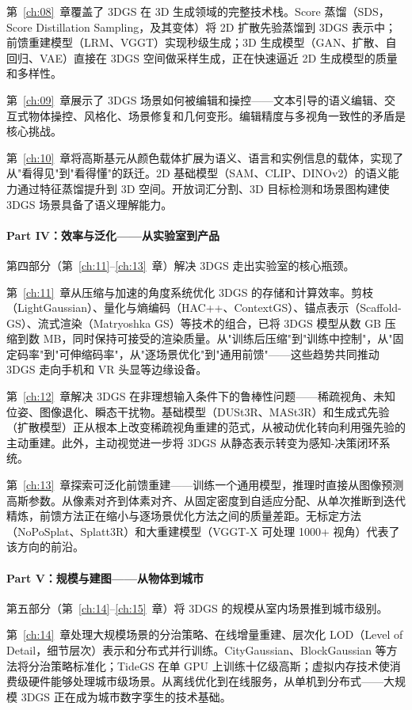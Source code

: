 第~\ref{ch:08}~章覆盖了 3DGS 在 3D 生成领域的完整技术栈。Score 蒸馏（SDS，Score Distillation Sampling，及其变体）将 2D 扩散先验蒸馏到 3DGS 表示中；前馈重建模型（LRM、VGGT）实现秒级生成；3D 生成模型（GAN、扩散、自回归、VAE）直接在 3DGS 空间做采样生成，正在快速逼近 2D 生成模型的质量和多样性。

第~\ref{ch:09}~章展示了 3DGS 场景如何被编辑和操控——文本引导的语义编辑、交互式物体操控、风格化、场景修复和几何变形。编辑精度与多视角一致性的矛盾是核心挑战。

第~\ref{ch:10}~章将高斯基元从颜色载体扩展为语义、语言和实例信息的载体，实现了从"看得见"到"看得懂"的跃迁。2D 基础模型（SAM、CLIP、DINOv2）的语义能力通过特征蒸馏提升到 3D 空间。开放词汇分割、3D 目标检测和场景图构建使 3DGS 场景具备了语义理解能力。

\paragraph{Part IV：效率与泛化——从实验室到产品}
第四部分（第~\ref{ch:11}--\ref{ch:13}~章）解决 3DGS 走出实验室的核心瓶颈。

第~\ref{ch:11}~章从压缩与加速的角度系统优化 3DGS 的存储和计算效率。剪枝（LightGaussian）、量化与熵编码（HAC++、ContextGS）、锚点表示（Scaffold-GS）、流式渲染（Matryoshka GS）等技术的组合，已将 3DGS 模型从数 GB 压缩到数 MB，同时保持可接受的渲染质量。从"训练后压缩"到"训练中控制"，从"固定码率"到"可伸缩码率"，从"逐场景优化"到"通用前馈"——这些趋势共同推动 3DGS 走向手机和 VR 头显等边缘设备。

第~\ref{ch:12}~章解决 3DGS 在非理想输入条件下的鲁棒性问题——稀疏视角、未知位姿、图像退化、瞬态干扰物。基础模型（DUSt3R、MASt3R）和生成式先验（扩散模型）正从根本上改变稀疏视角重建的范式，从被动优化转向利用强先验的主动重建。此外，主动视觉进一步将 3DGS 从静态表示转变为感知-决策闭环系统。

第~\ref{ch:13}~章探索可泛化前馈重建——训练一个通用模型，推理时直接从图像预测高斯参数。从像素对齐到体素对齐、从固定密度到自适应分配、从单次推断到迭代精炼，前馈方法正在缩小与逐场景优化方法之间的质量差距。无标定方法（NoPoSplat、Splatt3R）和大重建模型（VGGT-X 可处理 1000+ 视角）代表了该方向的前沿。

\paragraph{Part V：规模与建图——从物体到城市}
第五部分（第~\ref{ch:14}--\ref{ch:15}~章）将 3DGS 的规模从室内场景推到城市级别。

第~\ref{ch:14}~章处理大规模场景的分治策略、在线增量重建、层次化 LOD（Level of Detail，细节层次）表示和分布式并行训练。CityGaussian、BlockGaussian 等方法将分治策略标准化；TideGS 在单 GPU 上训练十亿级高斯；虚拟内存技术使消费级硬件能够处理城市级场景。从离线优化到在线服务，从单机到分布式——大规模 3DGS 正在成为城市数字孪生的技术基础。

